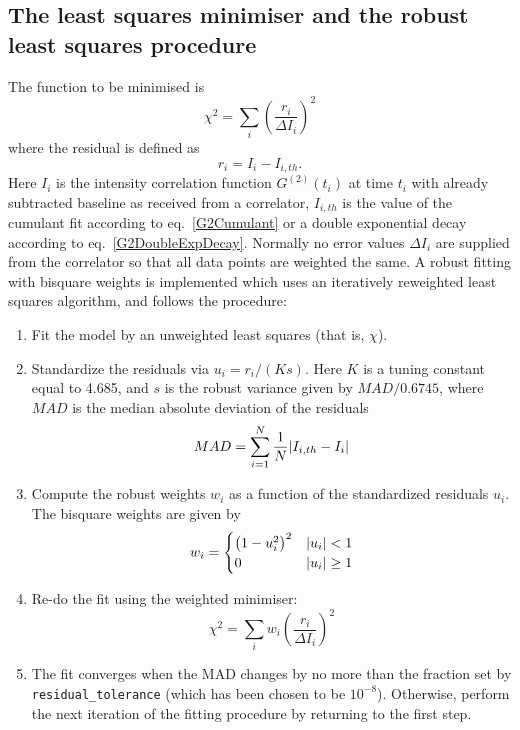 \newpage
\subsection{The least squares minimiser and the robust least squares
procedure}
The function to be minimised is
$$
\chi^2 = \sum_i \left( \frac{r_i}{\Delta I_i} \right)^2
$$
where the residual is defined as
$$
r_i = I_i - I_{i,th}.
$$
Here $I_i$  is the intensity correlation function $G^{(2)}(t_i)$
at time $t_i$ with already subtracted baseline as received from a correlator, $I_{i,th}$ is the value
of the cumulant fit according to eq.\ \ref{G2Cumulant} or a double exponential decay according to
eq.\ \ref{G2DoubleExpDecay}. Normally no error values
$\Delta I_i$ are supplied from the correlator so that all data points are weighted
the same. A robust fitting with bisquare weights is implemented which uses an
iteratively reweighted least squares algorithm, and follows the procedure:
\begin{enumerate}
\item Fit the model by an unweighted least
squares (that is,  $\chi$).
\item Standardize the residuals via $u_i=r_i/(Ks)$. Here $K$
is a tuning constant equal to 4.685, and $s$ is the robust variance
given by $MAD/0.6745$, where $MAD$ is the median absolute deviation of
the residuals
$$
MAD = \sum_{i=1}^N \frac{1}{N}\abs{I_{i,th}-I_i}
$$
\item Compute the robust weights $w_i$ as a function of the standardized residuals $u_i$.
The bisquare weights are given by
$$
w_i =
\begin{cases}
\left(1-u_i^2 \right)^2 & \abs{u_i} < 1 \\
0                       & \abs{u_i} \geq 1
\end{cases}
$$
\item  Re-do the fit using the weighted minimiser:
$$
\chi^2 = \sum_i w_i \left( \frac{r_i}{\Delta I_i} \right)^2
$$
\item The fit converges when the MAD changes by no more than the fraction set by
{\verb"residual_tolerance"} (which has been chosen to be $10^{-8}$). Otherwise, perform the next iteration of the
fitting procedure by returning to the first step.
\end{enumerate}


